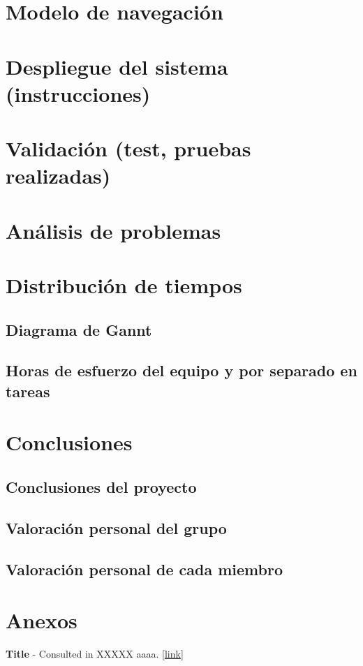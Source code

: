 \documentclass[a4paper]{article}
\begin{document}
\section{Modelo de navegación}

\section{Despliegue del sistema (instrucciones)}

\section{Validación (test, pruebas realizadas)}

\section{Análisis de problemas}

\section{Distribución de tiempos}
	\subsection{Diagrama de Gannt}
	\subsection{Horas de esfuerzo del equipo y por separado en tareas}

\section{Conclusiones}
	\subsection{Conclusiones del proyecto}
	\subsection{Valoración personal del grupo}
	\subsection{Valoración personal de cada miembro}
\section{Anexos}

\newpage
\begin{thebibliography}{99} 
 \textbf{Title} - Consulted in XXXXX aaaa. [\url{link}]

\end{thebibliography}
\end{document}
